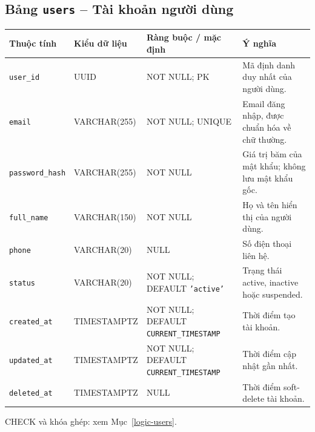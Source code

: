\subsection{Bảng \texttt{users} -- Tài khoản người dùng}
\label{dictionary-users}
\begingroup
\footnotesize
\setlength{\tabcolsep}{3pt}
\begin{longtable}{>{\raggedright\arraybackslash}p{3.1cm}>{\raggedright\arraybackslash}p{2.5cm}>{\raggedright\arraybackslash}p{3.7cm}>{\raggedright\arraybackslash}p{4.3cm}}
\toprule
Thuộc tính & Kiểu dữ liệu & Ràng buộc / mặc định & Ý nghĩa \\
\midrule
\endhead
\texttt{user\_\allowbreak{}id} & UUID & NOT NULL; PK & Mã định danh duy nhất của người dùng. \\
\texttt{email} & VARCHAR(255) & NOT NULL; UNIQUE & Email đăng nhập, được chuẩn hóa về chữ thường. \\
\texttt{password\_\allowbreak{}hash} & VARCHAR(255) & NOT NULL & Giá trị băm của mật khẩu; không lưu mật khẩu gốc. \\
\texttt{full\_\allowbreak{}name} & VARCHAR(150) & NOT NULL & Họ và tên hiển thị của người dùng. \\
\texttt{phone} & VARCHAR(20) & NULL & Số điện thoại liên hệ. \\
\texttt{status} & VARCHAR(20) & NOT NULL; DEFAULT \texttt{'active'} & Trạng thái active, inactive hoặc suspended. \\
\texttt{created\_\allowbreak{}at} & TIMESTAMPTZ & NOT NULL; DEFAULT \texttt{CURRENT\_\allowbreak{}TIMESTAMP} & Thời điểm tạo tài khoản. \\
\texttt{updated\_\allowbreak{}at} & TIMESTAMPTZ & NOT NULL; DEFAULT \texttt{CURRENT\_\allowbreak{}TIMESTAMP} & Thời điểm cập nhật gần nhất. \\
\texttt{deleted\_\allowbreak{}at} & TIMESTAMPTZ & NULL & Thời điểm soft-delete tài khoản. \\
\bottomrule
\end{longtable}
\endgroup
CHECK và khóa ghép: xem Mục~\ref{logic-users}.
